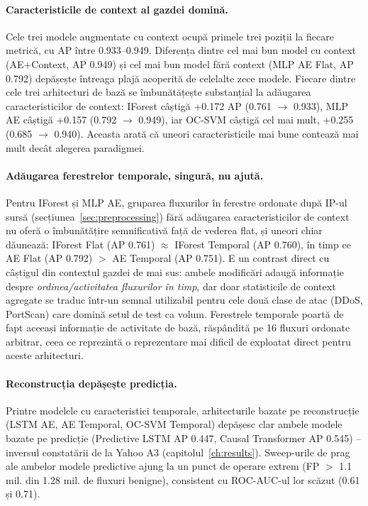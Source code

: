 \paragraph{Caracteristicile de context al gazdei domină.} Cele trei modele augmentate cu context ocupă primele trei poziții la fiecare metrică, cu AP între 0.933--0.949. Diferența dintre cel mai bun model cu context (AE+Context, AP 0.949) și cel mai bun model fără context (MLP AE Flat, AP 0.792) depășește întreaga plajă acoperită de celelalte zece modele.
Fiecare dintre cele trei arhitecturi de bază se îmbunătățește substanțial la adăugarea caracteristicilor de context: IForest câștigă +0.172 AP (0.761 $\to$ 0.933), MLP AE câștigă +0.157 (0.792 $\to$ 0.949), iar OC-SVM câștigă cel mai mult, +0.255 (0.685 $\to$ 0.940). Aceasta arată că uneori caracteristicile mai bune contează mai mult decât alegerea paradigmei.

\paragraph{Adăugarea ferestrelor temporale, singură, nu ajută.} Pentru IForest și MLP AE, gruparea fluxurilor în ferestre ordonate după IP-ul sursă (secțiunea~\ref{sec:preprocessing}) fără adăugarea caracteristicilor de context nu oferă o îmbunătățire semnificativă față de vederea flat, și uneori chiar dăunează: IForest Flat (AP 0.761) $\approx$ IForest Temporal (AP 0.760), în timp ce AE Flat (AP 0.792) $>$ AE Temporal (AP 0.751).
E un contrast direct cu câștigul din contextul gazdei de mai sus: ambele modificări adaugă informație despre \emph{ordinea/activitatea fluxurilor în timp}, dar doar statisticile de context agregate se traduc într-un semnal utilizabil pentru cele două clase de atac (DDoS, PortScan) care domină setul de test ca volum.
Ferestrele temporale poartă de fapt aceeași informație de activitate de bază, răspândită pe 16 fluxuri ordonate arbitrar, ceea ce reprezintă o reprezentare mai dificil de exploatat direct pentru aceste arhitecturi.

\paragraph{Reconstrucția depășește predicția.} Printre modelele cu caracteristici temporale, arhitecturile bazate pe reconstrucție (LSTM AE, AE Temporal, OC-SVM Temporal) depășesc clar ambele modele bazate pe predicție (Predictive LSTM AP 0.447, Causal Transformer AP 0.545) -- inversul constatării de la Yahoo A3 (capitolul~\ref{ch:results}).
Sweep-urile de prag ale ambelor modele predictive ajung la un punct de operare extrem (FP $>$ 1.1 mil. din 1.28 mil. de fluxuri benigne), consistent cu ROC-AUC-ul lor scăzut (0.61 și 0.71).

